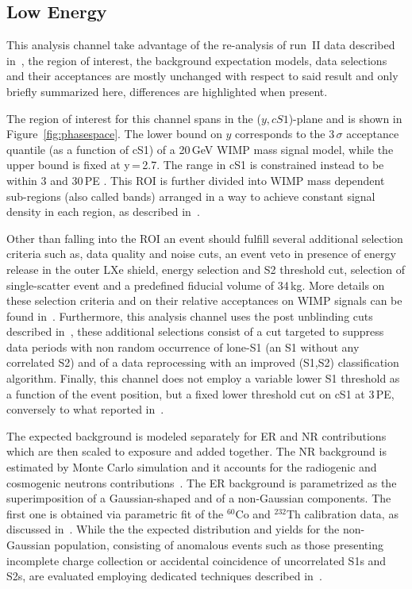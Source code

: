 
\subsection{Low Energy}
\label{subsec:LowE}
This analysis channel take advantage of the re-analysis of run~II data described in~\cite{xe100_run_combination}, the region of interest, the background 
expectation models, data selections and their acceptances are mostly unchanged with respect to said result and only briefly summarized here, 
differences are highlighted when present. 

The region of interest for this channel spans in the ($y,cS1$)-plane and is shown in Figure~\ref{fig:phasespace}.  The lower 
bound on $y$ corresponds to the 3\,$\sigma$ acceptance quantile (as a function of cS1) of a 20\,GeV WIMP mass signal model, while the upper bound is fixed at y\,=\,2.7.
The range in cS1 is constrained instead to be within 3 and 30\,PE . This  ROI is further divided into WIMP mass dependent sub-regions (also called bands) arranged in a way 
to achieve constant signal density in each region, as described in~\cite{xe100_run_combination}.

Other than falling into the ROI an event should fulfill several additional selection criteria such as, data quality and noise cuts,
an event veto in presence of energy release in the outer LXe shield, energy selection and S2 threshold cut,
selection of single-scatter event and a predefined fiducial volume of 34\,kg. More details on these selection criteria and on their 
relative acceptances on WIMP signals can be found in~\cite{Aprile:2012vw,xe100_run_combination}. 
Furthermore, this analysis channel uses the post unblinding cuts described in~\cite{xe100_run_combination}, 
these additional selections consist of a cut targeted to suppress data periods with non random occurrence of lone-S1 (an S1 without 
any correlated S2) and of a data reprocessing with an improved (S1,S2) classification algorithm.
Finally, this channel does not employ a variable lower S1 threshold as a function of the event position, but a fixed 
lower threshold cut on cS1 at 3\,PE, conversely to what reported in~\cite{xe100_run_combination}.

The expected background is modeled separately for ER and NR contributions which are then scaled to exposure and added together.
The NR background is estimated by Monte Carlo simulation and it accounts for the radiogenic and cosmogenic neutrons
contributions~\cite{Aprile:2013tov}.
The ER background is parametrized as the superimposition of a Gaussian-shaped and of a non-Gaussian components.
The first one is obtained via  parametric fit of the $^{60}$Co and $^{232}$Th calibration data, as discussed in~\cite{xe100_run10_si}.
While the the expected distribution and yields for the non-Gaussian population, consisting of anomalous events such as those 
presenting incomplete charge collection or accidental coincidence of uncorrelated S1s and S2s,  
are evaluated employing dedicated techniques described in~\cite{xe100_run_combination}.

